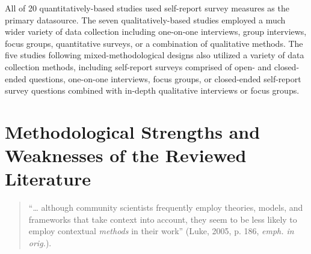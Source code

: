\documentclass[11pt,]{tufte-book}
\begin{document}
All of 20 quantitatively-based studies used self-report survey measures
as the primary datasource. The seven qualitatively-based studies
employed a much wider variety of data collection including one-on-one
interviews, group interviews, focus groups, quantitative surveys, or a
combination of qualitative methods. The five studies following
mixed-methodological designs also utilized a variety of data collection
methods, including self-report surveys comprised of open- and
closed-ended questions, one-on-one interviews, focus groups, or
closed-ended self-report survey questions combined with in-depth
qualitative interviews or focus groups.

\chapter{Methodological Strengths and Weaknesses of the Reviewed
Literature}\label{methodological-strengths-and-weaknesses-of-the-reviewed-literature}

\begin{quote}
``\ldots{} although community scientists frequently employ theories,
models, and frameworks that take context into account, they seem to be
less likely to employ contextual \emph{methods} in their work'' (Luke,
2005, p. 186, \emph{emph. in orig.}).
\end{quote}
\end{document}
